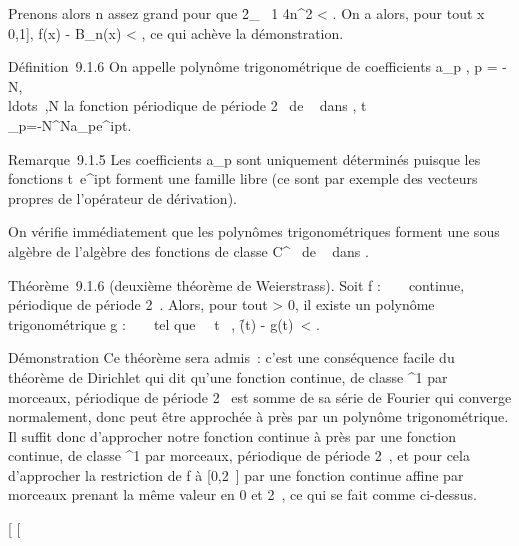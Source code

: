 \documentclass[]{article}
\begin{document}
Prenons alors n assez grand pour que
2\f_\infty~ 1
\over 4n\delta^2 \textless{} \epsilon
{} . On a alors, pour tout x \in {[}0,1{]},
f(x) - B_n(x) \textless{} \epsilon, ce qui achève
la démonstration.

Définition~9.1.6 On appelle polynôme trigonométrique de coefficients
a_p \in {}, p =
-N,\\ldots~,N la
fonction périodique de période 2\pi~ de ~ dans ,
t\mapsto~\\\sum
 _p=-N^Na_pe^ipt.

Remarque~9.1.5 Les coefficients a_p sont uniquement déterminés
puisque les fonctions t\mapsto~e^ipt
forment une famille libre (ce sont par exemple des vecteurs propres de
l'opérateur de dérivation).

On vérifie immédiatement que les polynômes trigonométriques forment une
sous algèbre de l'algèbre des fonctions de classe C^\infty~ de ~
dans .

Théorème~9.1.6 (deuxième théorème de Weierstrass). Soit f : ~ \rightarrow~ 
continue, périodique de période 2\pi~. Alors, pour tout \epsilon \textgreater{} 0,
il existe un polynôme trigonométrique g : ~ \rightarrow~  tel que
\forall~~t \in {}~, \f(t) -
g(t)\ \textless{} \epsilon.

Démonstration Ce théorème sera admis~: c'est une conséquence facile du
théorème de Dirichlet qui dit qu'une fonction continue, de classe
^1 par morceaux, périodique de période 2\pi~ est somme de sa
série de Fourier qui converge normalement, donc peut être approchée à 
\epsilon {} près par un polynôme trigonométrique. Il
suffit donc d'approcher notre fonction continue à  \epsilon
{} près par une fonction continue, de classe
^1 par morceaux, périodique de période 2\pi~, et pour cela
d'approcher la restriction de f à {[}0,2\pi~{]} par une fonction continue
affine par morceaux prenant la même valeur en 0 et 2\pi~, ce qui se fait
comme ci-dessus.

{[}
{[}
\end{document}
